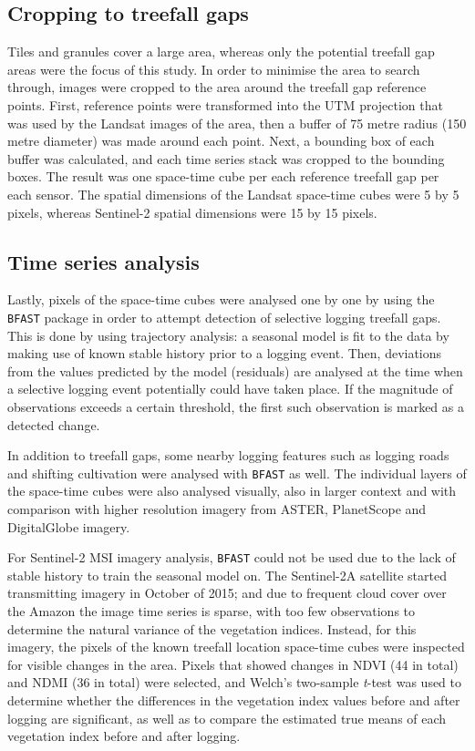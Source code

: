 \documentclass[a4paper,12pt]{scrbook}
\begin{document}
\subsection{Cropping to treefall gaps}

Tiles and granules cover a large area, whereas only the potential treefall gap areas were the focus of this study. In order to minimise the area to search through, images were cropped to the area around the treefall gap reference points. First, reference points were transformed into the \ac{UTM} projection that was used by the Landsat images of the area, then a buffer of 75 metre radius (150 metre diameter) was made around each point. Next, a bounding box of each buffer was calculated, and each time series stack was cropped to the bounding boxes. The result was one space-time cube per each reference treefall gap per each sensor. The spatial dimensions of the Landsat space-time cubes were 5 by 5 pixels, whereas Sentinel-2 spatial dimensions were 15 by 15 pixels.

\subsection{Time series analysis}

Lastly, pixels of the space-time cubes were analysed one by one by using the \texttt{BFAST} package \citep{verbesselt_detecting_2010} in order to attempt detection of selective logging treefall gaps. This is done by using trajectory analysis: a seasonal model is fit to the data by making use of known stable history prior to a logging event. Then, deviations from the values predicted by the model (residuals) are analysed at the time when a selective logging event potentially could have taken place. If the magnitude of observations exceeds a certain threshold, the first such observation is marked as a detected change.

In addition to treefall gaps, some nearby logging features such as logging roads and shifting cultivation were analysed with \texttt{BFAST} as well. The individual layers of the space-time cubes were also analysed visually, also in larger context and with comparison with higher resolution imagery from \ac{ASTER}, PlanetScope and DigitalGlobe imagery.

For Sentinel-2 \ac{MSI} imagery analysis, \texttt{BFAST} could not be used due to the lack of stable history to train the seasonal model on. The Sentinel-2A satellite started transmitting imagery in October of 2015; and due to frequent cloud cover over the Amazon the image time series is sparse, with too few observations to determine the natural variance of the vegetation indices. Instead, for this imagery, the pixels of the known treefall location space-time cubes were inspected for visible changes in the area. Pixels that showed changes in NDVI (44 in total) and NDMI (36 in total) were selected, and Welch's two-sample \textit{t}-test was used to determine whether the differences in the vegetation index values before and after logging are significant, as well as to compare the estimated true means of each vegetation index before and after logging.
\end{document}
